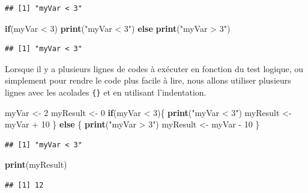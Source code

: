 \documentclass[twoside,symmetric]{book}
\newenvironment{Shaded}{}{}
\newcommand{\ControlFlowTok}[1]{\textbf{#1}}
\newcommand{\DecValTok}[1]{#1}
\newcommand{\KeywordTok}[1]{\textbf{#1}}
\newcommand{\NormalTok}[1]{#1}
\newcommand{\OperatorTok}[1]{#1}
\newcommand{\StringTok}[1]{#1}
\begin{document}
\begin{verbatim}
## [1] "myVar < 3"
\end{verbatim}

\begin{Shaded}
\begin{Highlighting}[]
\ControlFlowTok{if}\NormalTok{(myVar }\OperatorTok{<}\StringTok{ }\DecValTok{3}\NormalTok{) }\KeywordTok{print}\NormalTok{(}\StringTok{"myVar < 3"}\NormalTok{) }\ControlFlowTok{else} \KeywordTok{print}\NormalTok{(}\StringTok{"myVar > 3"}\NormalTok{)}
\end{Highlighting}
\end{Shaded}

\begin{verbatim}
## [1] "myVar < 3"
\end{verbatim}

Lorsque il y a plusieurs lignes de codes à exécuter en fonction du test logique, ou simplement pour rendre le code plus facile à lire, nous allons utiliser plusieurs lignes avec les acolades \texttt{\{\}} et en utilisant l'indentation.

\begin{Shaded}
\begin{Highlighting}[]
\NormalTok{myVar <-}\StringTok{ }\DecValTok{2}
\NormalTok{myResult <-}\StringTok{ }\DecValTok{0}
\ControlFlowTok{if}\NormalTok{(myVar }\OperatorTok{<}\StringTok{ }\DecValTok{3}\NormalTok{)\{}
  \KeywordTok{print}\NormalTok{(}\StringTok{"myVar < 3"}\NormalTok{)}
\NormalTok{  myResult <-}\StringTok{ }\NormalTok{myVar }\OperatorTok{+}\StringTok{ }\DecValTok{10}
\NormalTok{\} }\ControlFlowTok{else}\NormalTok{ \{}
  \KeywordTok{print}\NormalTok{(}\StringTok{"myVar > 3"}\NormalTok{)}
\NormalTok{  myResult <-}\StringTok{ }\NormalTok{myVar }\OperatorTok{-}\StringTok{ }\DecValTok{10}
\NormalTok{\}}
\end{Highlighting}
\end{Shaded}

\begin{verbatim}
## [1] "myVar < 3"
\end{verbatim}

\begin{Shaded}
\begin{Highlighting}[]
\KeywordTok{print}\NormalTok{(myResult)}
\end{Highlighting}
\end{Shaded}

\begin{verbatim}
## [1] 12
\end{verbatim}
\end{document}
